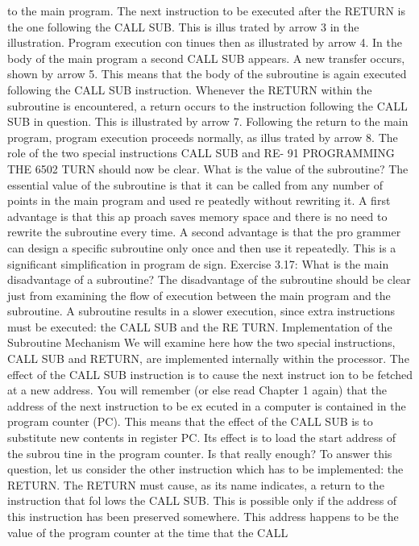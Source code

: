 \documentclass{book}
\begin{document}
to the main program. The next instruction to be executed after
the RETURN is the one following the CALL SUB. This is illus
trated by arrow 3 in the illustration. Program execution con
tinues then as illustrated by arrow 4.
In the body of the main program a second CALL SUB appears.
A new transfer occurs, shown by arrow 5. This means that the
body of the subroutine is again executed following the CALL SUB
instruction.
Whenever the RETURN within the subroutine is encountered,
a return occurs to the instruction following the CALL SUB in
question. This is illustrated by arrow 7. Following the return to
the main program, program execution proceeds normally, as illus
trated by arrow 8.
The role of the two special instructions CALL SUB and RE-
91
PROGRAMMING THE 6502
TURN should now be clear. What is the value of the subroutine?
The essential value of the subroutine is that it can be called
from any number of points in the main program and used re
peatedly without rewriting it. A first advantage is that this ap
proach saves memory space and there is no need to rewrite the
subroutine every time. A second advantage is that the pro
grammer can design a specific subroutine only once and then use
it repeatedly. This is a significant simplification in program de
sign.
Exercise 3.17: What is the main disadvantage of a subroutine?
The disadvantage of the subroutine should be clear just from
examining the flow of execution between the main program and
the subroutine. A subroutine results in a slower execution, since
extra instructions must be executed: the CALL SUB and the RE
TURN.
Implementation of the Subroutine Mechanism
We will examine here how the two special instructions, CALL
SUB and RETURN, are implemented internally within the processor.
The effect of the CALL SUB instruction is to cause the next instruct
ion to be fetched at a new address. You will remember (or else read
Chapter 1 again) that the address of the next instruction to be ex
ecuted in a computer is contained in the program counter (PC). This
means that the effect of the CALL SUB is to substitute new contents
in register PC. Its effect is to load the start address of the subrou
tine in the program counter. Is that really enough?
To answer this question, let us consider the other instruction
which has to be implemented: the RETURN. The RETURN must
cause, as its name indicates, a return to the instruction that fol
lows the CALL SUB. This is possible only if the address of this
instruction has been preserved somewhere. This address happens
to be the value of the program counter at the time that the CALL
\end{document}
